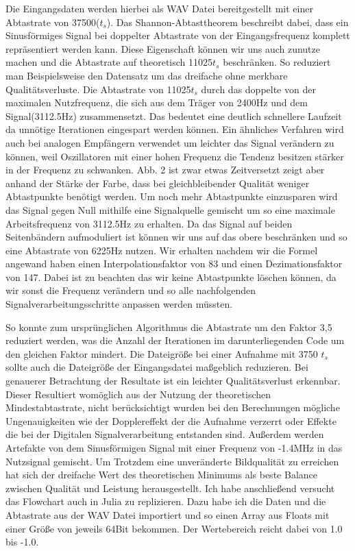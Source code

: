 \begin{multicols*}{2}
    Die Eingangsdaten werden hierbei als WAV Datei bereitgestellt mit einer Abtastrate von 37500(\( t_s \)). Das Shannon-Abtasttheorem beschreibt dabei, dass ein Sinusförmiges Signal bei doppelter Abtastrate von der Eingangsfrequenz komplett repräsentiert werden kann. Diese Eigenschaft können wir uns auch zunutze machen und die Abtastrate auf theoretisch 11025\( t_s \) beschränken. So reduziert man Beispielsweise den Datensatz um das dreifache ohne merkbare Qualitätsverluste. Die Abtastrate von 11025\( t_s \) durch das doppelte von der maximalen Nutzfrequenz, die sich aus dem Träger von 2400Hz und dem Signal(3112.5Hz) zusammensetzt. Das bedeutet eine deutlich schnellere Laufzeit da unnötige Iterationen eingespart werden können. Ein ähnliches Verfahren wird auch bei analogen Empfängern verwendet um leichter das Signal verändern zu können, weil Oszillatoren mit einer hohen Frequenz die Tendenz besitzen stärker in der Frequenz zu schwanken. 
    Abb. 2 ist zwar etwas Zeitversetzt zeigt aber anhand der Stärke der Farbe, dass bei gleichbleibender Qualität weniger Abtastpunkte benötigt werden. Um noch mehr Abtastpunkte einzusparen wird das Signal gegen Null mithilfe eine Signalquelle gemischt um so eine maximale Arbeitsfrequenz von 3112.5Hz zu erhalten. Da das Signal auf beiden Seitenbändern aufmoduliert ist können wir uns auf das obere beschränken und so eine Abtastrate von 6225Hz nutzen. Wir erhalten nachdem wir die Formel angewand haben einen Interpolationsfaktor von 83 und einen Dezimationsfaktor von 147. Dabei ist zu beachten das wir keine Abtastpunkte löschen können, da wir sonst die Frequenz verändern und so alle nachfolgenden Signalverarbeitungsschritte anpassen werden müssten.

    So konnte zum ursprünglichen Algorithmus die Abtastrate um den Faktor 3,5 reduziert werden, was die Anzahl der Iterationen im darunterliegenden Code um den gleichen Faktor mindert. Die Dateigröße bei einer Aufnahme mit 3750 \( t_s \) sollte auch die Dateigröße der Eingangsdatei maßgeblich reduzieren. Bei genauerer Betrachtung der Resultate ist ein leichter Qualitätsverlust erkennbar. Dieser Resultiert womöglich aus der Nutzung der theoretischen Mindestabtastrate, nicht berücksichtigt wurden bei den Berechnungen mögliche Ungenauigkeiten wie der Dopplereffekt der die Aufnahme verzerrt oder Effekte die bei der Digitalen Signalverarbeitung entstanden sind. Außerdem werden Artefakte von dem Sinusförmigen Signal mit einer Frequenz von -1.4MHz in das Nutzsignal gemischt. Um Trotzdem eine unveränderte Bildqualität zu erreichen hat sich der dreifache Wert des theoretischen Minimums als beste Balance zwischen Qualität und Leistung herausgestellt. 
    Ich habe anschließend versucht das Flowchart auch in Julia zu replizieren. Dazu habe ich die Daten und die Abtastrate aus der WAV Datei importiert und so einen Array aus Floats mit einer Größe von jeweils 64Bit bekommen. Der Wertebereich reicht dabei von 1.0 bis -1.0.
   

\end{multicols*}
